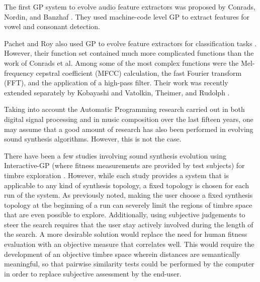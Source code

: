 \documentclass[12pt]{report} 	%
\numberwithin{figure}{chapter}
\numberwithin{table}{chapter}
\numberwithin{equation}{chapter}
\begin{document}
\begin{flushleft}
The first GP system to evolve audio feature extractors was proposed by Conrads, Nordin, and Banzhaf \cite{Conrads:1998wb}. They used machine-code level GP to extract features for vowel and consonant detection. 

Pachet and Roy also used GP to evolve feature extractors for classification tasks \cite{Pachet:2007if}. However, their function set contained much more complicated functions than the work of Conrads et al. Among some of the most complex functions were the Mel-frequency cepstral coefficient (MFCC) calculation, the fast Fourier transform (FFT), and the application of a high-pass filter. Their work was recently extended separately by Kobayashi and Vatolkin, Theimer, and Rudolph \cite{Kobayashi:2009la, Vatolkin:2009bd}.

Taking into account the Automatic Programming research carried out in both digital signal processing and in music composition over the last fifteen years, one may assume that a good amount of research has also been performed in evolving sound synthesis algorithms. However, this is not the case.

There have been a few studies involving sound synthesis evolution using Interactive-GP (where fitness measurements are provided by test subjects) for timbre exploration \cite{Dahlstedt:2001dd, Mandelis:2005iw, McDermott:2006gd}. However, while each study provides a system that is applicable to any kind of synthesis topology, a fixed topology is chosen for each run of the system. As previously noted, making the user choose a fixed synthesis topology at the beginning of a run can severely limit the regions of timbre space that are even possible to explore. Additionally, using subjective judgements to steer the search requires that the user stay actively involved during the length of the search. A more desirable solution would replace the need for human fitness evaluation with an objective measure that correlates well. This would require the development of an objective timbre space wherein distances are semantically meaningful, so that pairwise similarity tests could be performed by the computer in order to replace subjective assessment by the end-user.


\end{flushleft}
\end{document}
